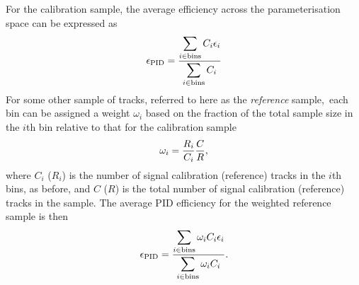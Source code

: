 For the calibration sample, the average efficiency across the parameterisation 
space can be expressed as
\begin{equation}
  \effpid = \frac{%
    \displaystyle\sum_{i \in \textnormal{bins}} C_{i}\eff_{i}
    }{%
    \displaystyle\sum_{i \in \textnormal{bins}} C_{i}
    }
\end{equation}
For some other sample of tracks, referred to here as the \emph{reference} 
sample,\footnotemark\ each bin can be assigned a weight $\omega_{i}$ based on 
the fraction of the total sample size in the $i$th bin relative to that for the 
calibration sample
\begin{equation}
  \omega_{i} = \frac{%
    R_{i}
  }{%
    C_{i}
  }\frac{%
    C
  }{%
    R
  },
  \label{eqn:prod:effs:pid:ref_weight}
\end{equation}
where $C_{i}$ ($R_{i}$) is the number of signal calibration (reference) tracks 
in the $i$th bins, as before, and $C$ ($R$) is the total number of signal 
calibration (reference) tracks in the sample.
The average \ac{PID} efficiency for the weighted reference sample is then
\begin{equation}
  \effpid = \frac{%
    \displaystyle\sum_{i \in \textnormal{bins}} \omega_{i}C_{i}\eff_{i}
  }{%
    \displaystyle\sum_{i \in \textnormal{bins}} \omega_{i}C_{i}
  }.
  \label{eqn:prod:effs:pid:single_track_ref_eff}
\end{equation}


